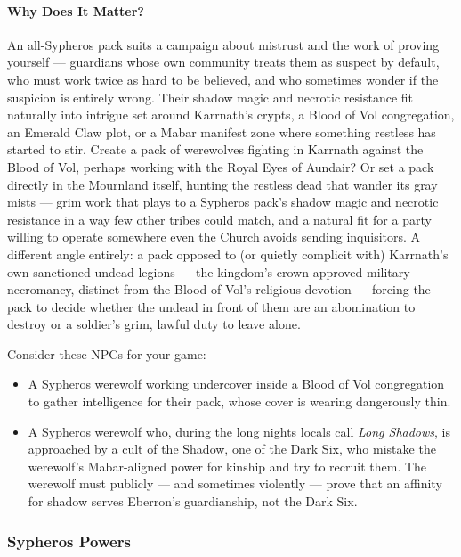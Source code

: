 \documentclass[twocolumn]{dndbook}
\begin{document}
\paragraph*{Why Does It Matter?} An all-Sypheros pack suits a campaign about mistrust and the work of proving yourself --- guardians whose own community treats them as suspect by default, who must work twice as hard to be believed, and who sometimes wonder if the suspicion is entirely wrong.
Their shadow magic and necrotic resistance fit naturally into intrigue set around Karrnath's crypts, a Blood of Vol congregation, an Emerald Claw plot, or a Mabar manifest zone where something restless has started to stir.
Create a pack of werewolves fighting in Karrnath against the Blood of Vol, perhaps working with the Royal Eyes of Aundair?
Or set a pack directly in the Mournland itself, hunting the restless dead that wander its gray mists --- grim work that plays to a Sypheros pack's shadow magic and necrotic resistance in a way few other tribes could match, and a natural fit for a party willing to operate somewhere even the Church avoids sending inquisitors.
A different angle entirely: a pack opposed to (or quietly complicit with) Karrnath's own sanctioned undead legions --- the kingdom's crown-approved military necromancy, distinct from the Blood of Vol's religious devotion --- forcing the pack to decide whether the undead in front of them are an abomination to destroy or a soldier's grim, lawful duty to leave alone.

Consider these NPCs for your game:
\begin{itemize}
    \item A Sypheros werewolf working undercover inside a Blood of Vol congregation to gather intelligence for their pack, whose cover is wearing dangerously thin.
    \item A Sypheros werewolf who, during the long nights locals call \emph{Long Shadows}, is approached by a cult of the Shadow, one of the Dark Six, who mistake the werewolf's Mabar-aligned power for kinship and try to recruit them. The werewolf must publicly --- and sometimes violently --- prove that an affinity for shadow serves Eberron's guardianship, not the Dark Six.
\end{itemize}


\subsubsection{Sypheros Powers}
\end{document}
